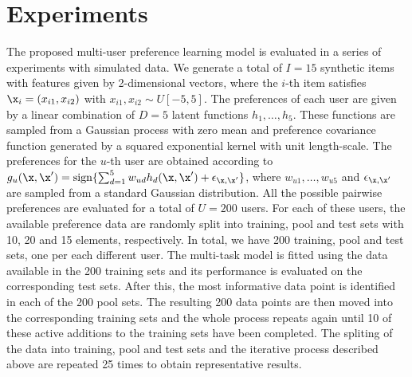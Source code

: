 \section{Experiments}\label{sec:experiments}



The proposed multi-user preference learning model is evaluated in a series of experiments with simulated data.
We generate a total of $I=15$ synthetic items with features given by 2-dimensional vectors,
where the $i$-th item satisfies
$\x_i=(x_{i1},x_{i2})$ with $x_{i1},x_{i2} \sim U[-5, 5]$. The preferences of each user are given
by a linear combination of $D=5$ latent functions $h_1,\ldots,h_5$. These functions are sampled from a Gaussian process
with zero mean and preference covariance function generated by a squared exponential kernel with unit length-scale.
The preferences for the $u$-th user are obtained according to 
$g_u(\x, \x') = \text{sign}\{ \sum_{d=1}^5 w_{ud} h_d(\x, \x') + \epsilon_{\x,\x'} \}$,
where $w_{u1},\ldots,w_{u5}$ and $\epsilon_{\x, \x'}$ are sampled from a standard Gaussian distribution.
All the possible pairwise preferences are evaluated for a total of $U = 200$ users. 
For each of these users, the available preference data are randomly split into training, pool and test sets with 10, 20 and 15 elements, respectively.
In total, we have 200 training, pool and test sets, one per each different user.
The multi-task model is fitted using the data available in the 200 training sets and its performance is
evaluated on the corresponding test sets. After this, the most informative data point is identified in each of the 200 pool sets.
The resulting 200 data points are then moved into the corresponding training sets and the whole process repeats
again until 10 of these active additions to the training sets have been completed.
The spliting of the data into training, pool and test sets and the iterative process described
above are repeated 25 times to obtain representative results.


